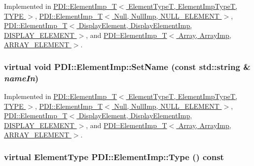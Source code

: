 Implemented in \hyperlink{class_p_d_i_1_1_element_imp___t_b1d86a7e12685823023fa2dc11d36f02}{PDI::ElementImp\_\-T$<$ ElementTypeT, ElementImpTypeT, TYPE $>$}, \hyperlink{class_p_d_i_1_1_element_imp___t_b1d86a7e12685823023fa2dc11d36f02}{PDI::ElementImp\_\-T$<$ Null, NullImp, NULL\_\-ELEMENT $>$}, \hyperlink{class_p_d_i_1_1_element_imp___t_b1d86a7e12685823023fa2dc11d36f02}{PDI::ElementImp\_\-T$<$ DisplayElement, DisplayElementImp, DISPLAY\_\-ELEMENT $>$}, and \hyperlink{class_p_d_i_1_1_element_imp___t_b1d86a7e12685823023fa2dc11d36f02}{PDI::ElementImp\_\-T$<$ Array, ArrayImp, ARRAY\_\-ELEMENT $>$}.\hypertarget{class_p_d_i_1_1_element_imp_deb17b530a00980a60e8e79753b19eed}{
\subsubsection[{SetName}]{\setlength{\rightskip}{0pt plus 5cm}virtual void PDI::ElementImp::SetName (const std::string \& {\em nameIn})}}
\label{class_p_d_i_1_1_element_imp_deb17b530a00980a60e8e79753b19eed}




Implemented in \hyperlink{class_p_d_i_1_1_element_imp___t_6faa00112b7690d462881ba5863c214f}{PDI::ElementImp\_\-T$<$ ElementTypeT, ElementImpTypeT, TYPE $>$}, \hyperlink{class_p_d_i_1_1_element_imp___t_6faa00112b7690d462881ba5863c214f}{PDI::ElementImp\_\-T$<$ Null, NullImp, NULL\_\-ELEMENT $>$}, \hyperlink{class_p_d_i_1_1_element_imp___t_6faa00112b7690d462881ba5863c214f}{PDI::ElementImp\_\-T$<$ DisplayElement, DisplayElementImp, DISPLAY\_\-ELEMENT $>$}, and \hyperlink{class_p_d_i_1_1_element_imp___t_6faa00112b7690d462881ba5863c214f}{PDI::ElementImp\_\-T$<$ Array, ArrayImp, ARRAY\_\-ELEMENT $>$}.\hypertarget{class_p_d_i_1_1_element_imp_1ab2a2d2523b358077129413c4eddd15}{
\subsubsection[{Type}]{\setlength{\rightskip}{0pt plus 5cm}virtual {\bf ElementType} PDI::ElementImp::Type () const}}
\label{class_p_d_i_1_1_element_imp_1ab2a2d2523b358077129413c4eddd15}




